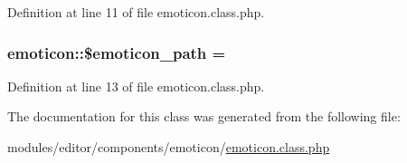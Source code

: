Definition at line 11 of file emoticon.\+class.\+php.

\hypertarget{classemoticon_a21bb58c0d640141cc27203b584f99dd8}{}
\subsubsection[{\$emoticon\+\_\+path}]{\setlength{\rightskip}{0pt plus 5cm}emoticon\+::\$emoticon\+\_\+path = \textquotesingle{}\textquotesingle{}}\label{classemoticon_a21bb58c0d640141cc27203b584f99dd8}


Definition at line 13 of file emoticon.\+class.\+php.



The documentation for this class was generated from the following file\+:\begin{DoxyCompactItemize}
\item 
modules/editor/components/emoticon/\hyperlink{emoticon_8class_8php}{emoticon.\+class.\+php}\end{DoxyCompactItemize}
